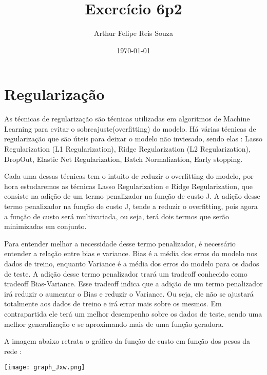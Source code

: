 \documentclass{article}
\begin{document}
\title{Exercício 6p2} 
\author{Arthur Felipe Reis Souza}
\date{\today}
\maketitle

\vspace{20pt}

\section{Regularização}

\vspace{20pt}

As técnicas de regularização são técnicas utilizadas em algoritmos de Machine Learning para evitar o sobreajuste(overfitting) do modelo. Há várias técnicas de regularização que são úteis para deixar o modelo não inviesado, sendo elas : Lasso Regularization (L1 Regularization), Ridge Regularization (L2 Regularization), DropOut, Elastic Net Regularization, Batch Normalization, Early stopping.
\vspace{20pt}

Cada uma dessas técnicas tem o intuito de reduzir o overfitting do modelo, por hora estudaremos as técnicas Lasso Regularization e Ridge Regularization, que consiste na adição de um termo penalizador na função de custo J. A adição desse termo penalizador na função de custo J, tende a reduzir o overfitting, pois agora a função de custo será multivariada, ou seja, terá dois termos que serão minimizadas em conjunto.
\vspace{20pt}

Para entender melhor a necessidade desse termo penalizador, é necessário entender a relação entre bias e variance. Bias é a média dos erros do modelo nos dados de treino, enquanto Variance é a média dos erros do modelo para os dados de teste. A adição desse termo penalizador trará um tradeoff conhecido como tradeoff Bias-Variance. Esse tradeoff indica que a adição de um termo penalizador irá reduzir o aumentar o Bias e reduzir o Variance. Ou seja, ele não se ajustará totalmente aos dados de treino e irá errar mais sobre os mesmos. Em contrapartida ele terá um melhor desempenho sobre os dados de teste, sendo uma melhor generalização e se aproximando mais de uma função geradora.
\vspace{60pt}

A imagem abaixo retrata o gráfico da função de custo em função dos pesos da rede : 
\begin{center}

\texttt{[image: graph\_Jxw.png]}

\end{center}
\end{document}
